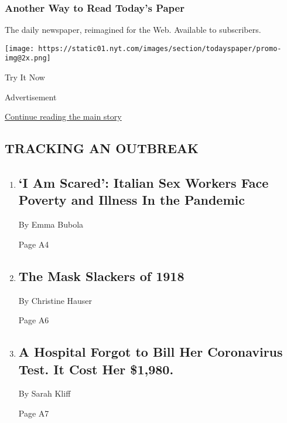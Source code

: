 \hypertarget{another-way-to-read-todays-paper}{%
\subsubsection{Another Way to Read Today's
Paper}\label{another-way-to-read-todays-paper}}

The daily newspaper, reimagined for the Web. Available to subscribers.

\texttt{[image: https://static01.nyt.com/images/section/todayspaper/promo-img@2x.png]}

Try It Now

Advertisement

\protect\hyperlink{after-mid1}{Continue reading the main story}

\hypertarget{tracking-an-outbreak}{%
\subsection{TRACKING AN OUTBREAK}\label{tracking-an-outbreak}}

\begin{enumerate}
\def\labelenumi{\arabic{enumi}.}
\item
  \href{/2020/08/03/world/europe/italy-coronavirus-prostitution-sex-work.html}{}

  \hypertarget{i-am-scared-italian-sex-workers-face-poverty-and-illness-in-the-pandemic}{%
  \subsection{`I Am Scared': Italian Sex Workers Face Poverty and
  Illness In the
  Pandemic}\label{i-am-scared-italian-sex-workers-face-poverty-and-illness-in-the-pandemic}}

  By Emma Bubola

  Page A4
\item
  \href{/2020/08/03/us/mask-protests-1918.html}{}

  \hypertarget{the-mask-slackers-of-1918-1}{%
  \subsection{The Mask Slackers of
  1918}\label{the-mask-slackers-of-1918-1}}

  By Christine Hauser

  Page A6
\item
  \href{/2020/08/03/upshot/nj-coronavirus-medical-bill.html}{}

  \hypertarget{a-hospital-forgot-to-bill-her-coronavirus-test-it-cost-her-1980}{%
  \subsection{A Hospital Forgot to Bill Her Coronavirus Test. It Cost
  Her
  \$1,980.}\label{a-hospital-forgot-to-bill-her-coronavirus-test-it-cost-her-1980}}

  By Sarah Kliff

  Page A7
\end{enumerate}

